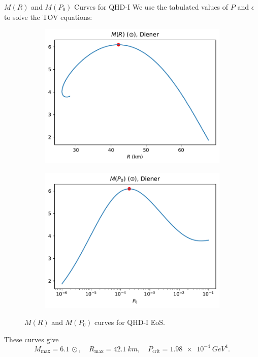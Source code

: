 \documentclass[]{beamer}
\begin{document}
    \begin{frame}{$M(R)$ and $M(P_0)$ Curves for QHD-I}
        We use the tabulated values of $P$ and $\epsilon$ to solve the TOV equations: \pause
        \begin{figure}[h!]
            \centering
            \begin{subfigure}{.5\textwidth}
                \includegraphics[width = \textwidth]{../paper/images/qhd1/r_analysis.pdf}
            \end{subfigure}%
            \begin{subfigure}{.5\textwidth}
                \includegraphics[width = \textwidth]{../paper/images/qhd1/p0_analysis.pdf}
            \end{subfigure}
            \caption[]{$M(R)$ and $M(P_0)$ curves for QHD-I EoS.}
        \end{figure}\pause
        \vspace{-3pt}
        These curves give \[M_\text{max} = \SI{6.1}{\odot}, \quad R_\text{max} = \SI{42.1}{km}, \quad P_\text{crit} = \SI{1.98e-4}{GeV^4}.\]
    \end{frame}
\end{document}
